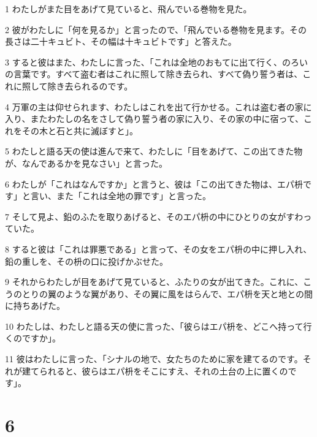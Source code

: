 \par 1 わたしがまた目をあげて見ていると、飛んでいる巻物を見た。
\par 2 彼がわたしに「何を見るか」と言ったので、「飛んでいる巻物を見ます。その長さは二十キュビト、その幅は十キュビトです」と答えた。
\par 3 すると彼はまた、わたしに言った、「これは全地のおもてに出て行く、のろいの言葉です。すべて盗む者はこれに照して除き去られ、すべて偽り誓う者は、これに照して除き去られるのです。
\par 4 万軍の主は仰せられます、わたしはこれを出て行かせる。これは盗む者の家に入り、またわたしの名をさして偽り誓う者の家に入り、その家の中に宿って、これをその木と石と共に滅ぼすと」。
\par 5 わたしと語る天の使は進んで来て、わたしに「目をあげて、この出てきた物が、なんであるかを見なさい」と言った。
\par 6 わたしが「これはなんですか」と言うと、彼は「この出てきた物は、エパ枡です」と言い、また「これは全地の罪です」と言った。
\par 7 そして見よ、鉛のふたを取りあげると、そのエパ枡の中にひとりの女がすわっていた。
\par 8 すると彼は「これは罪悪である」と言って、その女をエパ枡の中に押し入れ、鉛の重しを、その枡の口に投げかぶせた。
\par 9 それからわたしが目をあげて見ていると、ふたりの女が出てきた。これに、こうのとりの翼のような翼があり、その翼に風をはらんで、エパ枡を天と地との間に持ちあげた。
\par 10 わたしは、わたしと語る天の使に言った、「彼らはエパ枡を、どこへ持って行くのですか」。
\par 11 彼はわたしに言った、「シナルの地で、女たちのために家を建てるのです。それが建てられると、彼らはエパ枡をそこにすえ、それの土台の上に置くのです」。

\chapter{6}


